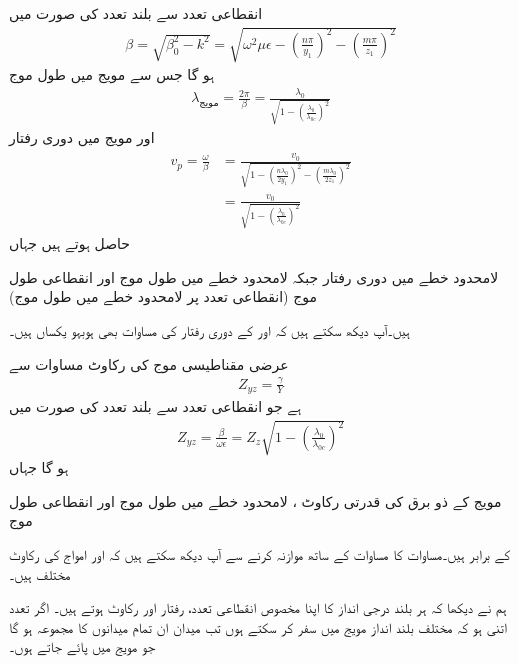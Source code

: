 انقطاعی تعدد سے بلند تعدد  کی صورت میں
\begin{align}
\beta=\sqrt{\beta_0^2-k^2}=\sqrt{\omega^2 \mu \epsilon-\left(\frac{n\pi}{y_1}\right)^2-\left(\frac{m\pi}{z_1}\right)^2}
\end{align}
ہو گا جس سے مویج میں طول موج
\begin{align}
\lambda_{\text{مویج}}=\frac{2\pi}{\beta}=\frac{\lambda_0}{\sqrt{1-\left(\frac{\lambda_0}{\lambda_{0c}}\right)^2}}
\end{align}
اور مویج میں  دوری رفتار
\begin{gather}
\begin{aligned}
v_p=\frac{\omega}{\beta}&=\frac{v_0}{\sqrt{1-\left(\frac{n\lambda_0}{2y_1}\right)^2-\left(\frac{m\lambda_0}{2z_1}\right)^2}}\\
&=\frac{v_0}{\sqrt{1-\left(\frac{\lambda_0}{\lambda_{0c}}\right)^2}}
\end{aligned}
\end{gather}
حاصل ہوتے ہیں جہاں
\begin{description}
 لامحدود خطے میں دوری رفتار  جبکہ 
 لامحدود خطے میں طول موج اور
 انقطاعی طول موج (انقطاعی تعدد پر لامحدود خطے میں طول موج)
\end{description}
ہیں۔آپ دیکھ سکتے ہیں کہ  اور  کے دوری رفتار کی مساوات بھی ہوبہو یکساں ہیں۔

عرضی مقناطیسی موج کی رکاوٹ مساوات  سے 
\begin{align*}
Z_{yz}=\frac{\gamma}{Y}
\end{align*}
ہے جو انقطاعی تعدد سے بلند تعدد  کی صورت میں
\begin{align}\label{مساوات_مویج_عرضی_مقناطیسی_رکاوٹ_حتمی}
Z_{yz}=\frac{\beta}{\omega \epsilon}=Z_z \sqrt{1-\left(\frac{\lambda_0}{\lambda_{0c}}\right)^2}
\end{align}
ہو گا جہاں
\begin{description}
 مویج کے ذو برق کی قدرتی رکاوٹ ، 
 لامحدود خطے میں طول موج اور
 انقطاعی طول موج
\end{description}
کے برابر ہیں۔مساوات  کا مساوات  کے ساتھ موازنہ کرنے سے آپ دیکھ سکتے ہیں کہ  اور  امواج کی رکاوٹ مختلف ہیں۔

ہم نے دیکھا کہ ہر بلند درجی انداز کا اپنا مخصوص انقطاعی تعدد، رفتار اور رکاوٹ ہوتے ہیں۔ اگر تعدد اتنی ہو کہ مختلف بلند انداز مویج میں سفر کر سکتے ہوں تب میدان ان تمام میدانوں کا مجموعہ ہو گا جو مویج میں پائے جاتے ہوں۔ 

